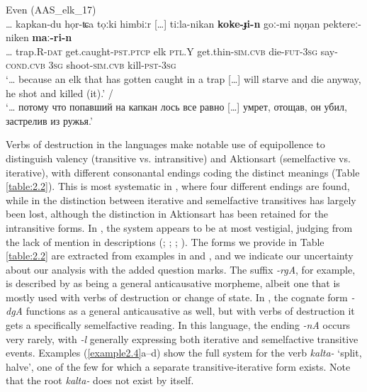 \documentclass[output=paper,colorlinks,citecolor=brown]{langscibook}
\begin{document}
\ea
    \label{example2.3}
     Even (AAS\_elk\_17)\\
    \gll … kapkan-du	họr-ʨa	tọːki	himbiːr […]	tiːla-nikan \textbf{koke-ɟi-n}	goː-mi	nọŋan	pektereː-niken	\textbf{maː-ri-n}\\
    … trap.R-\textsc{dat}	get.caught-\textsc{pst.ptcp}	elk	\textsc{ptl}.Y {}	get.thin-\textsc{sim.cvb} die-\textsc{fut-3sg}	say-\textsc{cond.cvb}	3\textsc{sg}	shoot-\textsc{sim.cvb}	kill-\textsc{pst-3sg}\\
    \glt ‘… because an elk that has gotten caught in a trap […] will starve and die anyway, he shot and killed (it).’ /\\‘… потому что попавший на капкан лось все равно […] умрет, отощав, он убил, застрелив из ружья.’\\
    \z

Verbs of destruction in the  languages make notable use of equipollence to distinguish valency (transitive vs. intransitive) and Aktionsart (semelfactive vs. iterative), with different consonantal endings coding the distinct meanings (Table \ref{table:2.2}). This is most systematic in , where four different endings are found, while in  the distinction between iterative and semelfactive transitives has largely been lost, although the distinction in Aktionsart has been retained for the intransitive forms. In , the system appears to be at most vestigial, judging from the lack of mention in descriptions (\citealt{Konstantinova1964A}; \citealt{Nedjalkov1997}; \citealt{BulatovaGrenoble1999}; \citealt{Boldyrev2007}). The forms we provide in Table \ref{table:2.2} are extracted from examples in \citet{Myreeva2004} and \citet{Boldyrev2007}, and we indicate our uncertainty about our analysis with the added question marks. The suffix \textit{-rgA}, for example, is described by \citet[228]{Nedjalkov1997} as being a general anticausative morpheme, albeit one that is mostly used with verbs of destruction or change of state. In , the cognate form \textit{-dgA} functions as a general anticausative as well, but with verbs of destruction it gets a specifically semelfactive reading. In this language, the ending \textit{-nA} occurs very rarely, with \textit{-l} generally expressing both iterative and semelfactive transitive events. Examples (\ref{example2.4}a--d) show the full system for the  verb \textit{kalta-} ‘split, halve’, one of the few for which a separate transitive-iterative form exists. Note that the root \textit{kalta-} does not exist by itself.
\end{document}
